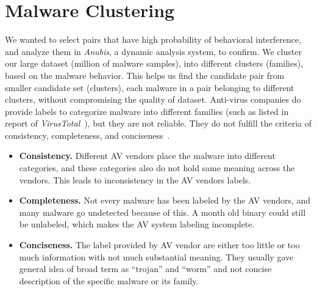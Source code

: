 \section{Malware Clustering}
\label{sec:Malware Clustering}
We wanted to select pairs that have high probability of behavioral interference, and analyze them in \emph{Anubis}, a dynamic analysis system, to confirm.
We cluster our large dataset (million of malware samples), into different clusters (families), based on the malware behavior.
This helps us find the candidate pair from smaller candidate set (clusters), each malware in a pair belonging to different clusters, without compromising the quality of dataset.
Anti-virus companies do provide labels to categorize malware into different families (such as listed in report of \emph{VirusTotal}~\cite[]{virustotal}), but they are not reliable.
They do not fulfill the criteria of consistency, completeness, and conciseness~\cite[]{bailey}.\\
\begin{itemize}
\item \textbf{Consistency.} Different AV vendors place the malware into different categories, and these categories also do not hold same meaning across the vendors.
This leads to inconsistency in the AV vendors labels.
\item \textbf{Completeness.} Not every malware has been labeled by the AV vendors, and many malware go undetected because of this.
A month old binary could still be unlabeled, which makes the AV system labeling incomplete.
\item \textbf{Conciseness.} The label provided by AV vendor are either too little or too much information with not much substantial meaning.
They usually gave general idea of broad term as ``trojan'' and ``worm'' and not concise description of the specific malware or its family.
\end{itemize}
